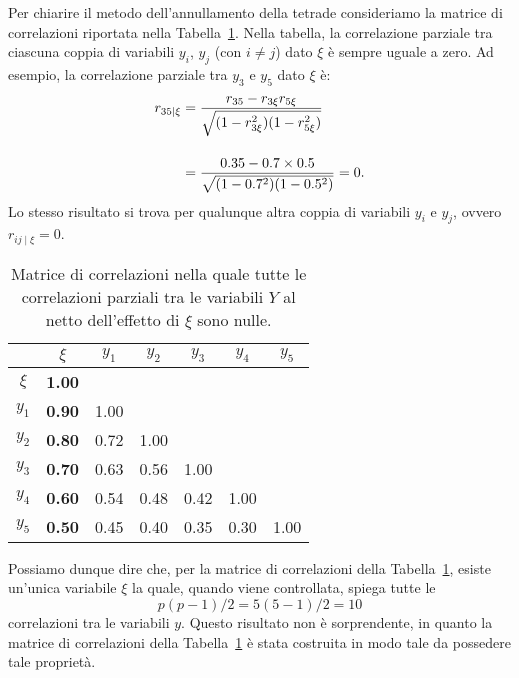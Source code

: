Per chiarire il metodo dell'annullamento della tetrade consideriamo la matrice di correlazioni riportata nella Tabella~\ref{tab:corr_parziale}.
Nella tabella, la correlazione parziale tra ciascuna coppia di variabili 
$y_i$, $y_j$ (con $i \neq j$) dato $\xi$ è sempre uguale a zero.  
Ad esempio, la correlazione parziale tra $y_3$ e $y_5$ dato $\xi$ è:
\begin{align}
  r_{35 \mid \xi} &= \frac{r_{35} - r_{3\xi}r_{5\xi}}
  {\sqrt{(1-r_{3\xi}^2)(1-r_{5\xi}^2)}} \notag \\[12pt]
  &= \frac{0.35 - 0.7 \times 0.5}
  {\sqrt{(1-0.7^2)(1-0.5^2)}} = 0. \notag
\end{align}
Lo stesso risultato si trova per qualunque altra coppia di variabili $y_i$ e $y_j$, ovvero $r_{ij \mid \xi} = 0$.

\begin{table}[h!]
\centering
      \caption{Matrice di correlazioni nella quale tutte le correlazioni parziali tra le variabili $Y$ al netto dell'effetto di $\xi$ sono nulle.}
  \begin{tabular}{ccccccc}
    \hline
    &  $\xi$ & $y_1$ & $y_2$ & $y_3$ & $y_4$ & $y_5$ \\
    \hline
    $\xi$   & \textbf{1.00} &   &   &   &   &   \\
    $y_1$ & \textbf{0.90} & 1.00 &   &   &   &   \\
    $y_2$ & \textbf{0.80} & 0.72 & 1.00 &   &   &   \\
    $y_3$ & \textbf{0.70} & 0.63 & 0.56 & 1.00 &   &   \\
    $y_4$ & \textbf{0.60} & 0.54 & 0.48 & 0.42 & 1.00 &   \\
    $y_5$ & \textbf{0.50} & 0.45 & 0.40 & 0.35 & 0.30 & 1.00 \\
    \hline
  \end{tabular}
  \label{tab:corr_parziale}
  \end{table}
  
Possiamo dunque dire che, per la matrice di correlazioni della Tabella~\ref{tab:corr_parziale}, esiste un'unica variabile $\xi$ la quale, quando viene controllata, spiega tutte le 
$$p(p-1)/2 = 5(5-1)/2=10$$ 
correlazioni tra le variabili $y$. 
Questo risultato non è sorprendente, in quanto la  matrice di correlazioni della Tabella~\ref{tab:corr_parziale} è stata costruita in modo tale da possedere tale proprietà.

